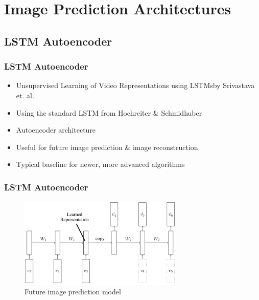 \section{Image Prediction Architectures} 
 \subsection{LSTM Autoencoder}
  \begin{frame}
   \frametitle{LSTM Autoencoder}
   
   \begin{itemize}
    \item<1-> \glqq Unsupervised Learning of Video Representations using LSTMs\grqq by Srivastava et. al. \cite{Srivastava2015}
    \item<2-> Using the standard LSTM from Hochreiter \& Schmidhuber \cite{Hochreiter1997}
    \item<3-> Autoencoder architecture
    \item<4-> Useful for future image prediction \& image reconstruction
    \item<5-> Typical baseline for newer, more advanced algorithms
   \end{itemize}
   
  \end{frame}
  \begin{frame}
   \frametitle{LSTM Autoencoder}
   
   \begin{figure}[H]
    \includegraphics[width=0.7\textwidth]{../Images/srivastava.png}
    \centering
    \caption{Future image prediction model \citep{Srivastava2015}}
    \label{fig:lstm_architecture}
   \end{figure}
  
  \end{frame}
